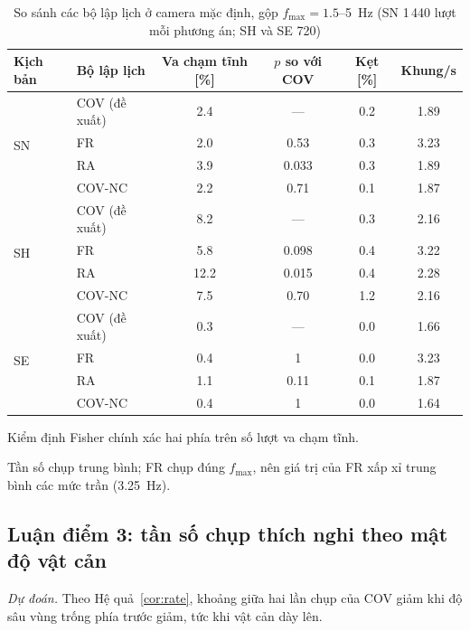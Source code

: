 \documentclass[11pt,a4paper]{article}
\theoremstyle{plain}
\theoremstyle{definition}
\theoremstyle{remark}
\newcommand{\fmax}{f_{\max}}
\begin{document}
\begin{table}[t]
\centering
\caption{So sánh các bộ lập lịch ở camera mặc định, gộp $\fmax = 1.5$--5~Hz (SN 1\,440 lượt mỗi phương án; SH và SE 720)}\label{tab:compare}
\small
\begin{threeparttable}
\begin{tabular}{@{}llcccc@{}}
\toprule
Kịch bản & Bộ lập lịch & Va chạm tĩnh [\%] & $p$ so với COV\tnote{a} & Kẹt [\%] & Khung/s\tnote{b} \\
\midrule
\multirow{4}{*}{SN} & COV (đề xuất) & 2.4 & --- & 0.2 & 1.89 \\
 & FR & 2.0 & 0.53 & 0.3 & 3.23 \\
 & RA & 3.9 & 0.033 & 0.3 & 1.89 \\
 & COV-NC & 2.2 & 0.71 & 0.1 & 1.87 \\
\midrule
\multirow{4}{*}{SH} & COV (đề xuất) & 8.2 & --- & 0.3 & 2.16 \\
 & FR & 5.8 & 0.098 & 0.4 & 3.22 \\
 & RA & 12.2 & 0.015 & 0.4 & 2.28 \\
 & COV-NC & 7.5 & 0.70 & 1.2 & 2.16 \\
\midrule
\multirow{4}{*}{SE} & COV (đề xuất) & 0.3 & --- & 0.0 & 1.66 \\
 & FR & 0.4 & 1 & 0.0 & 3.23 \\
 & RA & 1.1 & 0.11 & 0.1 & 1.87 \\
 & COV-NC & 0.4 & 1 & 0.0 & 1.64 \\
\bottomrule
\end{tabular}
\begin{tablenotes}\footnotesize
\item[a] Kiểm định Fisher chính xác hai phía trên số lượt va chạm tĩnh.
\item[b] Tần số chụp trung bình; FR chụp đúng $\fmax$, nên giá trị của FR xấp xỉ trung bình các mức trần (3.25~Hz).
\end{tablenotes}
\end{threeparttable}
\end{table}

\subsection{Luận điểm 3: tần số chụp thích nghi theo mật độ vật cản}\label{sec:r3}

\emph{Dự đoán.} Theo Hệ quả~\ref{cor:rate}, khoảng giữa hai lần chụp của COV giảm khi độ sâu vùng trống phía trước giảm, tức khi vật cản dày lên.
\end{document}

